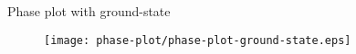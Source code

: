 \begin{frame}{Phase plot with ground-state}%
    \begin{figure}[htb]%
        \centering%
        \texttt{[image: phase-plot/phase-plot-ground-state.eps]}
    \end{figure}%
\end{frame}%
%